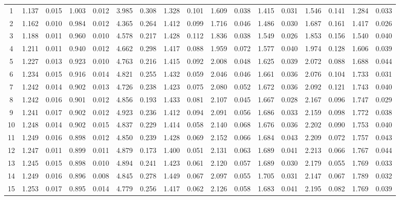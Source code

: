 \documentclass{article}
\begin{document}
\begin{table}[H]
{\begin{tabular}{|c|c|c|c|c|c|c|c|c|c|c|c|c|c|c|c|c|}
     1 & 1.137 & 0.015 & 1.003 & 0.012 & 3.985 & 0.308 & 1.328 & 0.101 & 1.609 & 0.038 & 1.415 & 0.031 & 1.546 & 0.141 & 1.284 & 0.033 \\ 
     2 & 1.162 & 0.010 & 0.984 & 0.012 & 4.365 & 0.264 & 1.412 & 0.099 & 1.716 & 0.046 & 1.486 & 0.030 & 1.687 & 0.161 & 1.417 & 0.026 \\ 
     3 & 1.188 & 0.011 & 0.960 & 0.010 & 4.578 & 0.217 & 1.428 & 0.112 & 1.836 & 0.038 & 1.549 & 0.026 & 1.853 & 0.156 & 1.540 & 0.040 \\ 
     4 & 1.211 & 0.011 & 0.940 & 0.012 & 4.662 & 0.298 & 1.417 & 0.088 & 1.959 & 0.072 & 1.577 & 0.040 & 1.974 & 0.128 & 1.606 & 0.039 \\ 
     5 & 1.227 & 0.013 & 0.923 & 0.010 & 4.763 & 0.216 & 1.415 & 0.092 & 2.008 & 0.048 & 1.625 & 0.039 & 2.072 & 0.088 & 1.688 & 0.044 \\ 
     6 & 1.234 & 0.015 & 0.916 & 0.014 & 4.821 & 0.255 & 1.432 & 0.059 & 2.046 & 0.046 & 1.661 & 0.036 & 2.076 & 0.104 & 1.733 & 0.031 \\ 
     7 & 1.242 & 0.014 & 0.902 & 0.013 & 4.726 & 0.238 & 1.423 & 0.075 & 2.080 & 0.052 & 1.672 & 0.036 & 2.092 & 0.121 & 1.743 & 0.040 \\ 
     8 & 1.242 & 0.016 & 0.901 & 0.012 & 4.856 & 0.193 & 1.433 & 0.081 & 2.107 & 0.045 & 1.667 & 0.028 & 2.167 & 0.096 & 1.747 & 0.029 \\ 
     9 & 1.241 & 0.017 & 0.902 & 0.012 & 4.923 & 0.236 & 1.412 & 0.094 & 2.091 & 0.056 & 1.686 & 0.033 & 2.159 & 0.098 & 1.772 & 0.038 \\ 
    10 & 1.248 & 0.014 & 0.902 & 0.015 & 4.837 & 0.229 & 1.414 & 0.058 & 2.140 & 0.068 & 1.676 & 0.036 & 2.202 & 0.090 & 1.753 & 0.040 \\ 
    11 & 1.249 & 0.016 & 0.898 & 0.012 & 4.850 & 0.239 & 1.428 & 0.069 & 2.152 & 0.066 & 1.684 & 0.043 & 2.209 & 0.072 & 1.757 & 0.043 \\ 
    12 & 1.247 & 0.011 & 0.899 & 0.011 & 4.879 & 0.173 & 1.400 & 0.051 & 2.131 & 0.063 & 1.689 & 0.041 & 2.213 & 0.066 & 1.767 & 0.044 \\ 
    13 & 1.245 & 0.015 & 0.898 & 0.010 & 4.894 & 0.241 & 1.423 & 0.061 & 2.120 & 0.057 & 1.689 & 0.030 & 2.179 & 0.055 & 1.769 & 0.033 \\ 
    14 & 1.249 & 0.016 & 0.896 & 0.008 & 4.845 & 0.278 & 1.449 & 0.067 & 2.097 & 0.055 & 1.705 & 0.031 & 2.147 & 0.067 & 1.789 & 0.032 \\ 
    15 & 1.253 & 0.017 & 0.895 & 0.014 & 4.779 & 0.256 & 1.417 & 0.062 & 2.126 & 0.058 & 1.683 & 0.041 & 2.195 & 0.082 & 1.769 & 0.039 \\ 

\end{tabular}}
\end{table}
\end{document}

